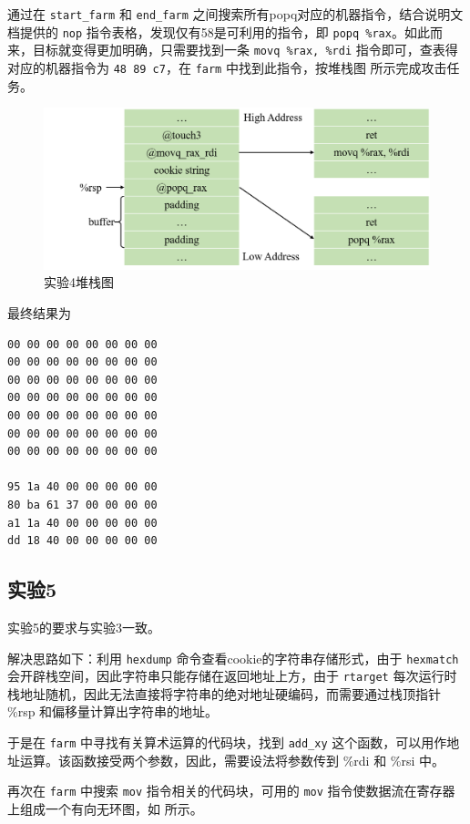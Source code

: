 \documentclass[12pt,a4paper]{article}
\begin{document}
通过在 \verb|start_farm| 和 \verb|end_farm| 之间搜索所有popq对应的机器指令，结合说明文档提供的 \verb|nop| 指令表格，发现仅有58是可利用的指令，即 \verb|popq %rax|。如此而来，目标就变得更加明确，只需要找到一条 \verb|movq %rax, %rdi| 指令即可，查表得对应的机器指令为 \verb|48 89 c7|，在 \verb|farm| 中找到此指令，按堆栈图  所示完成攻击任务。

\begin{figure}[H]
    \includegraphics[width=\textwidth]{./fig/4.png}
    \caption{实验4堆栈图}
    \label{figure:exp_4}
\end{figure}

最终结果为

\begin{lstlisting}
00 00 00 00 00 00 00 00
00 00 00 00 00 00 00 00
00 00 00 00 00 00 00 00
00 00 00 00 00 00 00 00
00 00 00 00 00 00 00 00
00 00 00 00 00 00 00 00
00 00 00 00 00 00 00 00

95 1a 40 00 00 00 00 00
80 ba 61 37 00 00 00 00
a1 1a 40 00 00 00 00 00
dd 18 40 00 00 00 00 00    
\end{lstlisting}

\subsection{实验5}

实验5的要求与实验3一致。

解决思路如下：利用 \verb|hexdump| 命令查看cookie的字符串存储形式，由于 \verb|hexmatch| 会开辟栈空间，因此字符串只能存储在返回地址上方，由于 \verb|rtarget| 每次运行时栈地址随机，因此无法直接将字符串的绝对地址硬编码，而需要通过栈顶指针 \%rsp 和偏移量计算出字符串的地址。

于是在 \verb|farm| 中寻找有关算术运算的代码块，找到 \verb|add_xy| 这个函数，可以用作地址运算。该函数接受两个参数，因此，需要设法将参数传到 \%rdi 和 \%rsi 中。

再次在 \verb|farm| 中搜索 \verb|mov| 指令相关的代码块，可用的 \verb|mov| 指令使数据流在寄存器上组成一个有向无环图，如  所示。
\end{document}
